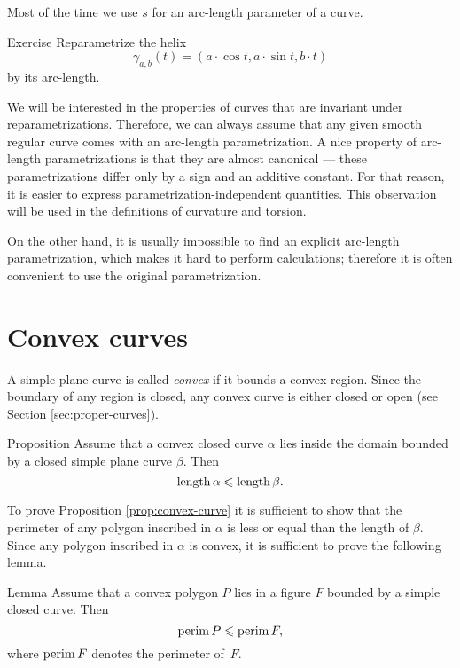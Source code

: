 Most of the time we use $s$ for an arc-length parameter of a curve.

\begin{thm}{Exercise}\label{ex:arc-length-helix}
Reparametrize the helix 
\[\gamma_{a,b}(t)=(a\cdot\cos t,a\cdot \sin t, b\cdot t)\]
by its arc-length.
\end{thm}

We will be interested in the properties of curves that are invariant under reparametrizations.
Therefore, we can always assume that any given smooth regular curve comes with an arc-length parametrization.
A nice property of arc-length parametrizations is that they are almost canonical --- these parametrizations differ only by a sign and an additive constant.
For that reason, it is easier to express parametrization-independent quantities.
This observation will be used in the definitions of curvature and torsion.

On the other hand, it is usually impossible to find an explicit arc-length parametrization, which makes it hard to perform calculations;
therefore it is often convenient to use the original parametrization.

\section{Convex curves}

A simple plane curve is called \emph{convex} if it bounds a convex region.
Since the boundary of any region is closed, any convex curve is either closed or open (see Section \ref{sec:proper-curves}).

\begin{thm}{Proposition}\label{prop:convex-curve}
Assume that a convex closed curve $\alpha$ lies inside the domain bounded by a closed simple plane curve $\beta$.
Then
\[\mathop{\rm length}\nolimits\alpha\leqslant \mathop{\rm length}\nolimits\beta.\]
\end{thm}

To prove Proposition \ref{prop:convex-curve} it is sufficient to show that the perimeter of any polygon inscribed in $\alpha$ is less or equal than the length of $\beta$.
Since any polygon inscribed in $\alpha$ is convex, it is sufficient to prove the following lemma.

\begin{thm}{Lemma}\label{lem:perimeter}
Assume that a convex polygon $P$ lies in a figure $F$ bounded by a simple closed curve.
Then 
\[\mathop{\rm perim}\nolimits P\leqslant \mathop{\rm perim}\nolimits F,\]
where $\mathop{\rm perim}\nolimits F$ denotes the perimeter of~$F$.
\end{thm}

